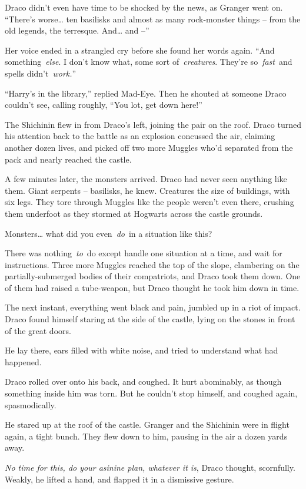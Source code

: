 Draco didn't even have time to be shocked by the news, as Granger went
on. ``There's worse\ldots{} ten basilisks and almost as many
rock-monster things -- from the old legends, the terresque. And\ldots{}
and --''

Her voice ended in a strangled cry before she found her words again.
``And something~\emph{else}. I don't know what, some sort
of~\emph{creatures}. They're so~\emph{fast}~and spells
didn't~\emph{work.}''

``Harry's in the library,'' replied Mad-Eye. Then he shouted at someone
Draco couldn't see, calling roughly, ``You lot, get down here!''

The Shichinin flew in from Draco's left, joining the pair on the roof.
Draco turned his attention back to the battle as an explosion concussed
the air, claiming another dozen lives, and picked off two more Muggles
who'd separated from the pack and nearly reached the castle.

A few minutes later, the monsters arrived. Draco had never seen anything
like them. Giant serpents -- basilisks, he knew. Creatures the size of
buildings, with six legs. They tore through Muggles like the people
weren't even there, crushing them underfoot as they stormed at Hogwarts
across the castle grounds.

Monsters\ldots{} what did you even~\emph{do}~in a situation like this?

There was nothing~\emph{to}~do except handle one situation at a time,
and wait for instructions. Three more Muggles reached the top of the
slope, clambering on the partially-submerged bodies of their
compatriots, and Draco took them down. One of them had raised a
tube-weapon, but Draco thought he took him down in time.

The next instant, everything went black and pain, jumbled up in a riot
of impact. Draco found himself staring at the side of the castle, lying
on the stones in front of the great doors.

He lay there, ears filled with white noise, and tried to understand what
had happened.

Draco rolled over onto his back, and coughed. It hurt abominably, as
though something inside him was torn. But he couldn't stop himself, and
coughed again, spasmodically.

He stared up at the roof of the castle. Granger and the Shichinin were
in flight again, a tight bunch. They flew down to him, pausing in the
air a dozen yards away.

\emph{No time for this, do your asinine plan, whatever it is}, Draco
thought, scornfully. Weakly, he lifted a hand, and flapped it in a
dismissive gesture.

